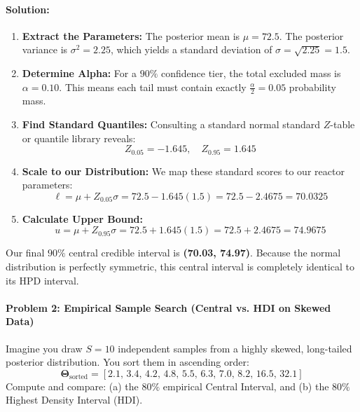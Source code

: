 \documentclass{article}
\begin{document}
\paragraph{Solution:}
\begin{enumerate}
    \item \textbf{Extract the Parameters:} The posterior mean is $\mu = 72.5$. The posterior variance is $\sigma^2 = 2.25$, which yields a standard deviation of $\sigma = \sqrt{2.25} = 1.5$.
    \item \textbf{Determine Alpha:} For a $90\%$ confidence tier, the total excluded mass is $\alpha = 0.10$. This means each tail must contain exactly $\frac{\alpha}{2} = 0.05$ probability mass.
    \item \textbf{Find Standard Quantiles:} Consulting a standard normal standard $Z$-table or quantile library reveals:
    \begin{equation}
    Z_{0.05} = -1.645, \quad Z_{0.95} = 1.645
    \end{equation}
    \item \textbf{Scale to our Distribution:} We map these standard scores to our reactor parameters:
    \begin{equation}
    \ell = \mu + Z_{0.05}\sigma = 72.5 - 1.645(1.5) = 72.5 - 2.4675 = 70.0325
    \end{equation}
    \item \textbf{Calculate Upper Bound:}
    \begin{equation}
    u = \mu + Z_{0.95}\sigma = 72.5 + 1.645(1.5) = 72.5 + 2.4675 = 74.9675
    \end{equation}
\end{enumerate}
Our final $90\%$ central credible interval is \textbf{(70.03, 74.97)}. Because the normal distribution is perfectly symmetric, this central interval is completely identical to its HPD interval.

\paragraph{Problem 2: Empirical Sample Search (Central vs. HDI on Skewed Data)}
Imagine you draw $S = 10$ independent samples from a highly skewed, long-tailed posterior distribution. You sort them in ascending order:
\begin{equation}
\boldsymbol{\Theta}_{\text{sorted}} = [2.1, \, 3.4, \, 4.2, \, 4.8, \, 5.5, \, 6.3, \, 7.0, \, 8.2, \, 16.5, \, 32.1]
\end{equation}
Compute and compare: (a) the $80\%$ empirical Central Interval, and (b) the $80\%$ Highest Density Interval (HDI).
\end{document}
